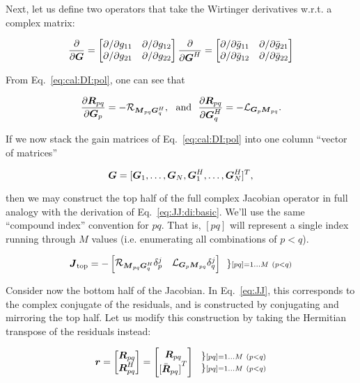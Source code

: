 \documentclass[useAMS,usenatbib]{mn2e}
\newcommand{\mat}[1]{{\bmath{#1}}}
\newcommand{\JJ}{\mat{J}} %
\newcommand{\MM}{\mat{M}}
\newcommand{\RR}{\mat{R}}
\newcommand{\GG}{\mat{G}}
\begin{document}
Next, let us define two operators that take the Wirtinger derivatives w.r.t. a complex matrix:

\begin{equation}
\frac{\partial}{\partial\GG} = \Matrix{cc}{ {\partial}/{\partial g_{11}} & {\partial}/{\partial g_{12}} \\
{\partial}/{\partial g_{21}} & {\partial}/{\partial g_{22}}} \\
\frac{\partial}{\partial{\GG^H}} = \Matrix{cc}{ {\partial}/{\partial \bar{g}_{11}} & {\partial}/{\partial \bar{g}_{21}} \\
{\partial}/{\partial \bar{g}_{12}} & {\partial}/{\partial \bar{g}_{22}}}
\end{equation}

From Eq.~\ref{eq:cal:DI:pol}, one can see that

\[
\frac{\partial\RR_{pq}}{\partial\GG_p} = -\Rop{\MM_{pq}\GG^H_q},\mathrm{~~and~~}
\frac{\partial\RR_{pq}}{\partial\GG^H_q} = -\Lop{\GG_p \MM_{pq}}.
\]

If we now stack the gain matrices of Eq.~\ref{eq:cal:DI:pol} into one column ``vector of matrices'' 

\[
\GG = [ \GG_1,\dots,\GG_N,\GG^H_1,\dots,\GG^H_N ]^T,
\]

then we may construct the top half of the full complex Jacobian operator in full analogy with the 
derivation of Eq.~\ref{eq:JJ:di:basic}. We'll use the same ``compound index'' convention for $pq$. That is, 
$[pq]$ will represent a single index running through $M$ values (i.e. enumerating all combinations of $p<q$).

\[
\JJ_\mathrm{top} = - \Matrix{cc}{ 
\Rop{ \MM_{pq}\GG^H_q }\delta^j_p & 
\Lop{ \GG_p \MM_{pq}  }\delta^j_q 
} ~~ \} \scriptstyle [pq]=1\dots M~(p<q)
% 
\]

Consider now the bottom half of the Jacobian. In Eq.~\ref{eq:JJ}, this corresponds to the complex conjugate of the residuals, 
and is constructed by conjugating and mirroring the top half. Let us modify this construction by taking the Hermitian transpose 
of the residuals instead:

\[
\bmath{r} = 
\Matrix{c}{
  \RR_{pq} \\ 
  \RR^H_{pq} 
} = 
\Matrix{c}{
  \RR_{pq} \\ 
  {[ \bar{\RR}_{pq} ]}^T
} 
~~ 
\Stack{ 
\} \scriptstyle [pq]=1\dots M~(p<q) \\ 
\} \scriptstyle [pq]=1\dots M~(p<q) 
}
\]
\end{document}
